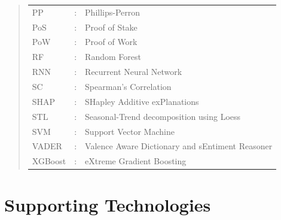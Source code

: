 \documentclass[ %
                    author={Raj Dhakan},
                supervisor={Dr. Ayush Joshi},
                    degree={MSc},
                     title={Ethereum Price Prediction using Internal and External Factors},
                  subtitle={},
                      type={},
                      year={2025}]{dissertation}
\begin{document}
\begin{quote}
\begin{tabular}{lcl}
PP&:& Phillips-Perron\\
PoS&:& Proof of Stake\\
PoW&:& Proof of Work\\
RF&:& Random Forest\\
RNN&:& Recurrent Neural Network\\
SC&:& Spearman's Correlation\\
SHAP&:& SHapley Additive exPlanations\\
STL&:& Seasonal-Trend decomposition using Loess\\
SVM&:& Support Vector Machine\\
VADER&:& Valence Aware Dictionary and sEntiment Reasoner\\
XGBoost&:& eXtreme Gradient Boosting\\
\end{tabular}
\end{quote}

\chapter*{Supporting Technologies}




\end{document}
